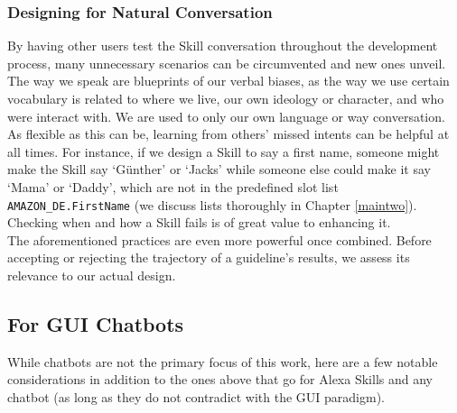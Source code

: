 \subsubsection*{Designing for Natural Conversation}
By having other users test the Skill conversation throughout the development process, many unnecessary scenarios can be circumvented and new ones unveil. The way we speak are blueprints of our verbal biases, as the way we use certain vocabulary is related to where we live, our own ideology or character, and who were interact with. We are used to only our own language or way conversation. As flexible as this can be, learning from others' missed intents can be helpful at all times. For instance, if we design a Skill to say a first name, someone might make the Skill say `Günther' or `Jacks' while someone else could make it say `Mama' or `Daddy', which are not in the predefined slot list \texttt{AMAZON_DE.FirstName} (we discuss lists thoroughly in Chapter \ref{maintwo}). Checking when and how a Skill fails is of great value to enhancing it.\\


The aforementioned practices are even more powerful once combined. Before accepting or rejecting the trajectory of a guideline's results, we assess its relevance to our actual design.






\subsection*{For GUI Chatbots}





While chatbots are not the primary focus of this work, here are a few notable considerations in addition to the ones above that go for Alexa Skills and any chatbot (as long as they do not contradict with the GUI paradigm).




